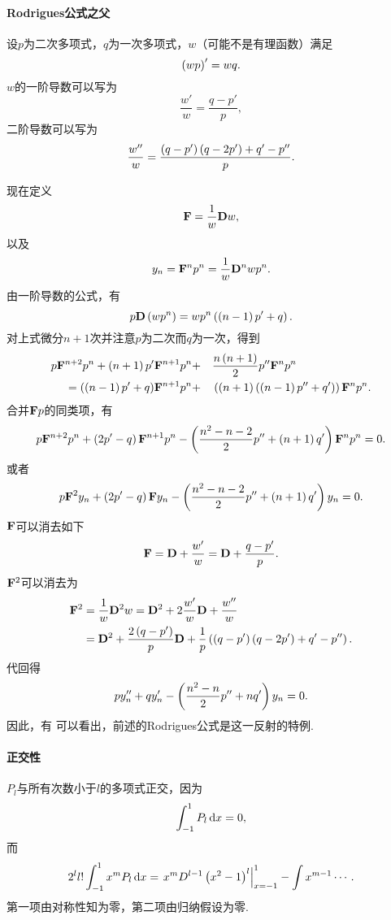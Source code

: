 \documentclass[UTF-8]{ctexart}
\begin{document}
  \paragraph{Rodrigues公式之父}设$p$为二次多项式，$q$为一次多项式，$w$（可能不是有理函数）满足
  \begin{equation}
    \label{eq:w}
    \left(wp\right)' = wq.
  \end{equation}
  $w$的一阶导数可以写为
  \[ \frac{w'}{w} = \frac{q-p'}{p}, \]
  二阶导数可以写为
  \[ \frac{w''}{w} = \frac{\left(q-p'\right)\left(q-2p'\right)+q'-p''}{p}. \]
  \par
  现在定义
  \[ \mathbf{F} = \frac{1}{w}\mathbf{D} w, \]
  以及
  \[ y_n = \mathbf{F}^np^n = \frac{1}{w}\mathbf{D}^nwp^n. \]
  由一阶导数的公式，有
  \[ p\mathbf{D}\left(wp^n\right) = wp^n\left(\left(n-1\right)p'+q\right). \]
  对上式微分$n+1$次并注意$p$为二次而$q$为一次，得到
  \begin{alignat*}{2}
    p\mathbf{F}^{n+2}p^n + \left(n+1\right)p' & \mathbf{F}^{n+1}p^n + && \frac{n\left(n+1\right)}{2}  p''\mathbf{F}^np^n \\
    = \left(\left(n-1\right)p'+q\right) & \mathbf{F}^{n+1}p^n + &&\left(\left(n+1\right)\left(\left(n- 1\right)p''+q'\right)\right) \mathbf{F}^np^n.
  \end{alignat*}
  合并$\mathbf{F} p$的同类项，有
  \[ p\mathbf{F}^{n+2}p^n + \left(2p'-q\right)\mathbf{F}^{n+1}p^n - \left(\frac{n^2-n-2}{2}p''+\left(n+1\right)q'\right)\mathbf{F}^np^n = 0. \]
  或者
  \[ p\mathbf{F}^2y_n + \left(2p'-q\right)\mathbf{F} y_n - \left(\frac{n^2-n-2}{2}p''+\left(n+1\right)q'\right)y_n = 0. \]
  $\mathbf{F}$可以消去如下
  \begin{equation*}
    \mathbf{F} = \mathbf{D} + \frac{w'}{w} = \mathbf{D} + \frac{q-p'}{p}.
  \end{equation*}
  $\mathbf{F}^2$可以消去为
  \begin{align*}
    \mathbf{F}^2 &= \frac{1}{w}\mathbf{D}^2w = \mathbf{D}^2+2\frac{w'}{w}\mathbf{D} + \frac{w''}{w} \\
           &= \mathbf{D}^2 + \frac{2\left(q-p'\right)}{p}\mathbf{D} + \frac{1}{p}\left(\left(q-p'\right)\left(q-2p'\right)+q'-p''\right).
  \end{align*}
  代回得
  \[ py''_n + qy'_n - \left(\frac{n^2-n}{2}p''+nq'\right)y_n = 0. \]
  因此，有
  可以看出，前述的Rodrigues公式是这一反射的特例.
  \paragraph{正交性}$P_l$与所有次数小于$l$的多项式正交，因为
  \[ \int_{-1}^{1} P_l \, \mathrm{d} x = 0, \]
  而
  \[ 2^ll!\int_{-1}^{1} x^mP_l \, \mathrm{d} x = \left. x^mD^{l-1}\left(x^2-1\right)^l\right\vert_{x=-1}^{1} - \int x^{m-1}\cdots.  \]
  第一项由对称性知为零，第二项由归纳假设为零.
\end{document}
